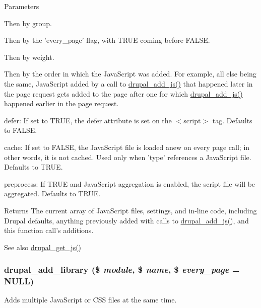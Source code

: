 \begin{DoxyParams}{Parameters}
\begin{DoxyItemize}
\begin{DoxyItemize}
\item Then by group.
\item Then by the 'every\_\-page' flag, with TRUE coming before FALSE.
\item Then by weight.
\item Then by the order in which the JavaScript was added. For example, all else being the same, JavaScript added by a call to \hyperlink{common_8inc_a623370a2c3c2de0390dab078d17dca02}{drupal\_\-add\_\-js()} that happened later in the page request gets added to the page after one for which \hyperlink{common_8inc_a623370a2c3c2de0390dab078d17dca02}{drupal\_\-add\_\-js()} happened earlier in the page request.
\end{DoxyItemize}
\item defer: If set to TRUE, the defer attribute is set on the $<$script$>$ tag. Defaults to FALSE.
\item cache: If set to FALSE, the JavaScript file is loaded anew on every page call; in other words, it is not cached. Used only when 'type' references a JavaScript file. Defaults to TRUE.
\item preprocess: If TRUE and JavaScript aggregation is enabled, the script file will be aggregated. Defaults to TRUE.
\end{DoxyItemize}\end{DoxyParams}
\begin{DoxyReturn}{Returns}
The current array of JavaScript files, settings, and in-\/line code, including Drupal defaults, anything previously added with calls to \hyperlink{common_8inc_a623370a2c3c2de0390dab078d17dca02}{drupal\_\-add\_\-js()}, and this function call's additions.
\end{DoxyReturn}
\begin{DoxySeeAlso}{See also}
\hyperlink{common_8inc_ac4d279ffd40eae67ace8459cd3e6e3b5}{drupal\_\-get\_\-js()} 
\end{DoxySeeAlso}
\hypertarget{common_8inc_a10d0b7349429391743b9ffc49b48908a}{
\subsubsection[{drupal\_\-add\_\-library}]{\setlength{\rightskip}{0pt plus 5cm}drupal\_\-add\_\-library (\$ {\em module}, \/  \$ {\em name}, \/  \$ {\em every\_\-page} = {\ttfamily NULL})}}
\label{common_8inc_a10d0b7349429391743b9ffc49b48908a}
Adds multiple JavaScript or CSS files at the same time.


